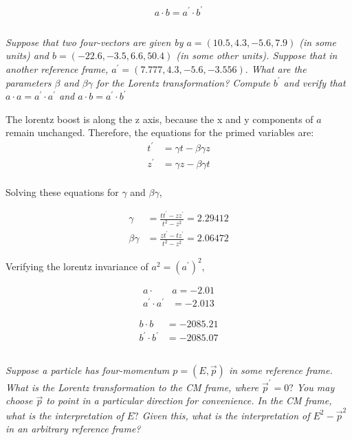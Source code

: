 \documentclass{article}
\begin{document}
\begin{equation*}
    \boxed{ a \cdot b=a^{\prime} \cdot b^{\prime}}
\end{equation*}

\subsection{}
\textit{Suppose that two four-vectors are given by $a=(10.5,4.3,-5.6,7.9)$ (in some units) and $b=(-22.6,-3.5,6.6,50.4)$ (in some other units). Suppose that in another reference frame, $a^{\prime}=(7.777,4.3,-5.6,-3.556) .$ What are the parameters $\beta$ and $\beta \gamma$ for the Lorentz transformation? Compute $b^{\prime}$ and verify that $a \cdot a=a^{\prime} \cdot a^{\prime}$ and $a \cdot b=a^{\prime} \cdot b^{\prime}$}

The lorentz boost is along the z axis, because the x and y components of $a$ remain unchanged. Therefore, the equations for the primed variables are: 
\begin{align*}
t^{\prime}&=\gamma t-\beta \gamma z \\
z^{\prime}&=\gamma z-\beta \gamma t \\
\end{align*}

Solving these equations for $\gamma$ and $\beta\gamma$,

\begin{align*}
\gamma&=\frac{t t^{\prime}-z z^{\prime}}{t^{2}-z^{2}}=2.29412 \\
\beta \gamma&=\frac{z t^{\prime}-t z^{\prime}}{t^{2}-z^{2}}=2.06472
\end{align*}

Verifying the lorentz invariance of $a^2 = (a^\prime)^2$,

\begin{align*}
a \cdot &a=-2.01 \\
a^{\prime} \cdot a^{\prime}&=-2.013
\end{align*}

\begin{align*}
b \cdot b&=-2085.21 \\
b^{\prime} \cdot b^{\prime}&=-2085.07
\end{align*}


\subsection{}
\textit{Suppose a particle has four-momentum $p=(E, \vec{p})$ in some reference frame. What is the Lorentz transformation to the CM frame, where $\vec{p}^{\prime}=0 ?$ You may choose $\vec{p}$ to point in a particular direction for convenience. In the CM frame, what is the interpretation of $E ?$ Given this, what is the interpretation of $E^{2}-\vec{p}^{2}$ in an arbitrary reference frame?}
\end{document}
